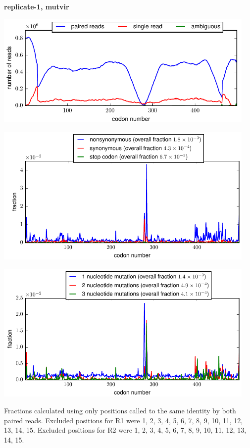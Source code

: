 \documentclass[10pt,letterpaper]{article}
\begin{document}
\centerline{\Large \bf replicate-1, mutvir}
\vspace{0.1in}

\centerline{\includegraphics[width=5in]{replicate-1-mutvir_codondepth.pdf}}
\vspace{0.1in}

\centerline{\includegraphics[width=5in]{replicate-1-mutvir_syn-ns-dist.pdf}}
\vspace{0.1in}

\centerline{\includegraphics[width=5in]{replicate-1-mutvir_nmutspercodon-dist.pdf}}
\vspace{0.1in}

Fractions calculated using only positions called to the same identity by both paired reads.  Excluded positions for R1 were 1, 2, 3, 4, 5, 6, 7, 8, 9, 10, 11, 12, 13, 14, 15. 
 Excluded positions for R2 were 1, 2, 3, 4, 5, 6, 7, 8, 9, 10, 11, 12, 13, 14, 15. 
\end{document}
